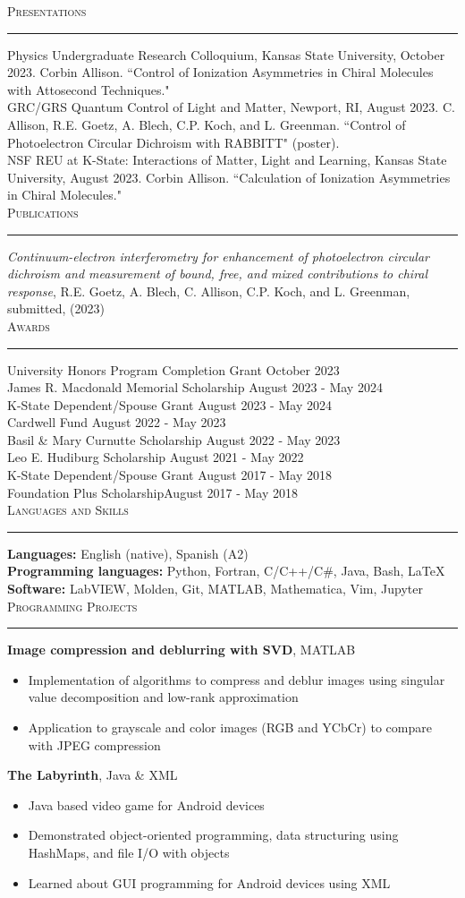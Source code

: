 \documentclass{article}
\newcommand{\return}{\\[6pt]}
\newcommand{\sect}[1]{
\noindent\large{\textsc{#1}}\\[-6pt]\normalsize{\noindent\rule{\textwidth}{0.5pt}}
}
\begin{document}
\sect{Presentations}
Physics Undergraduate Research Colloquium, Kansas State University, October 2023. Corbin Allison. ``Control of Ionization Asymmetries in Chiral Molecules with Attosecond Techniques." \return
GRC/GRS Quantum Control of Light and Matter, Newport, RI, August 2023. C. Allison, R.E. Goetz, A. Blech, C.P. Koch, and L. Greenman. ``Control of Photoelectron Circular Dichroism with RABBITT" (poster). \return
NSF REU at K-State: Interactions of Matter, Light and Learning, Kansas State University, August 2023. Corbin Allison. ``Calculation of Ionization Asymmetries in Chiral Molecules."\return
\sect{Publications}
\textit{Continuum-electron interferometry for enhancement of photoelectron circular dichroism and measurement of bound, free, and mixed contributions to chiral response}, R.E. Goetz, A. Blech,
C. Allison, C.P. Koch, and L. Greenman, submitted, (2023)\return
\sect{Awards}
University Honors Program Completion Grant \hfill October 2023 \return
James R. Macdonald Memorial Scholarship \hfill August 2023 - May 2024 \return
K-State Dependent/Spouse Grant \hfill August 2023 - May 2024 \return
Cardwell Fund \hfill August 2022 - May 2023 \return
Basil \& Mary Curnutte Scholarship \hfill August 2022 - May 2023 \return
Leo E. Hudiburg Scholarship \hfill August 2021 - May 2022 \return
K-State Dependent/Spouse Grant \hfill August 2017 - May 2018 \return
Foundation Plus Scholarship\hfill August 2017 - May 2018 \return
\sect{Languages and Skills}
\textbf{Languages:} English (native), Spanish (A2) \return
\textbf{Programming languages:} Python, Fortran, C/C++/C\#, Java, Bash, \LaTeX \return
\textbf{Software:} LabVIEW, Molden, Git, MATLAB, Mathematica, Vim, Jupyter \return
\sect{Programming Projects}
\textbf{Image compression and deblurring with SVD}, MATLAB 
\begin{itemize}
	\item Implementation of algorithms to compress and deblur images using singular value decomposition and low-rank approximation
	\item Application to grayscale and color images (RGB and YCbCr) to compare with JPEG compression
\end{itemize} 
\textbf{The Labyrinth}, Java \& XML
\begin{itemize}
	\item Java based video game for Android devices
	\item Demonstrated object-oriented programming, data structuring using HashMaps, and file I/O with objects
	\item Learned about GUI programming for Android devices using XML
\end{itemize}
\end{document}
